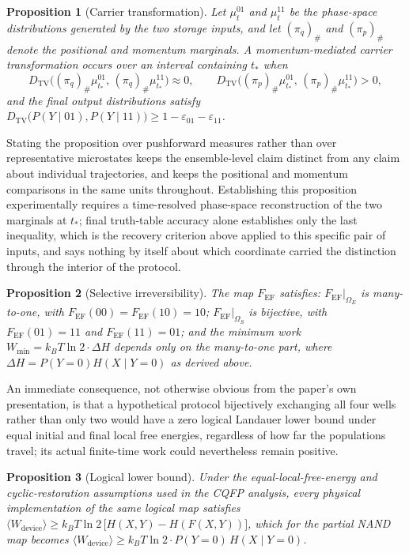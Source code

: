 \documentclass[11pt]{article}
\newtheorem{proposition}{Proposition}
\begin{document}
\begin{proposition}[Carrier transformation]
Let $\mu_t^{01}$ and $\mu_t^{11}$ be the phase-space distributions generated by the two storage inputs, and let $(\pi_q)_\#$ and $(\pi_p)_\#$ denote the positional and momentum marginals. A momentum-mediated carrier transformation occurs over an interval containing $t_\ast$ when
\[
D_{\mathrm{TV}}\bigl((\pi_q)_\#\mu_{t_\ast}^{01},\,(\pi_q)_\#\mu_{t_\ast}^{11}\bigr) \approx 0, \qquad D_{\mathrm{TV}}\bigl((\pi_p)_\#\mu_{t_\ast}^{01},\,(\pi_p)_\#\mu_{t_\ast}^{11}\bigr) > 0,
\]
and the final output distributions satisfy $D_{\mathrm{TV}}\bigl(P(Y\mid01),P(Y\mid11)\bigr) \ge 1-\varepsilon_{01}-\varepsilon_{11}$.
\end{proposition}

Stating the proposition over pushforward measures rather than over representative microstates keeps the ensemble-level claim distinct from any claim about individual trajectories, and keeps the positional and momentum comparisons in the same units throughout. Establishing this proposition experimentally requires a time-resolved phase-space reconstruction of the two marginals at $t_\ast$; final truth-table accuracy alone establishes only the last inequality, which is the recovery criterion above applied to this specific pair of inputs, and says nothing by itself about which coordinate carried the distinction through the interior of the protocol.

\begin{proposition}[Selective irreversibility]
The map $F_{\mathrm{EF}}$ satisfies: $F_{\mathrm{EF}}\vert_{\Omega_E}$ is many-to-one, with $F_{\mathrm{EF}}(00)=F_{\mathrm{EF}}(10)=10$; $F_{\mathrm{EF}}\vert_{\Omega_S}$ is bijective, with $F_{\mathrm{EF}}(01)=11$ and $F_{\mathrm{EF}}(11)=01$; and the minimum work $W_{\min}=k_BT\ln2\cdot\Delta H$ depends only on the many-to-one part, where $\Delta H = P(Y=0)H(X\mid Y=0)$ as derived above.
\end{proposition}

An immediate consequence, not otherwise obvious from the paper's own presentation, is that a hypothetical protocol bijectively exchanging all four wells rather than only two would have a zero logical Landauer lower bound under equal initial and final local free energies, regardless of how far the populations travel; its actual finite-time work could nevertheless remain positive.

\begin{proposition}[Logical lower bound]
Under the equal-local-free-energy and cyclic-restoration assumptions used in the CQFP analysis, every physical implementation of the same logical map satisfies $\langle W_{\mathrm{device}}\rangle \ge k_BT\ln2\,\bigl[H(X,Y)-H(F(X,Y))\bigr]$, which for the partial NAND map becomes $\langle W_{\mathrm{device}}\rangle \ge k_BT\ln2\cdot P(Y=0)\,H(X\mid Y=0)$.
\end{proposition}
\end{document}
